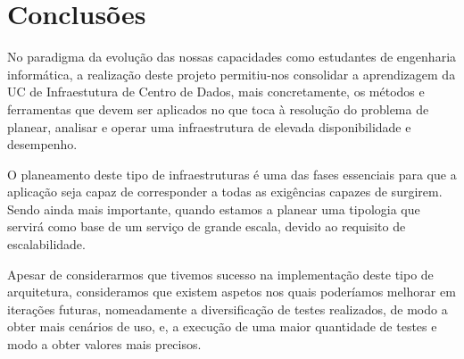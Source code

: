 \section{Conclusões}

No paradigma da evolução das nossas capacidades como estudantes de engenharia informática, a realização deste projeto permitiu-nos consolidar a aprendizagem da UC de Infraestutura de Centro de Dados, mais concretamente, os métodos e ferramentas que devem ser aplicados no que toca à resolução do problema de planear, analisar e operar uma infraestrutura de elevada disponibilidade e desempenho.

O planeamento deste tipo de infraestruturas é uma das fases essenciais para que a aplicação seja capaz de corresponder a todas as exigências capazes de surgirem. Sendo ainda mais importante, quando estamos a planear uma tipologia que servirá como base de um serviço de grande escala, devido ao requisito de escalabilidade.

Apesar de considerarmos que tivemos sucesso na implementação deste tipo de arquitetura, consideramos que existem aspetos nos quais poderíamos melhorar em iterações futuras, nomeadamente a diversificação de testes realizados, de modo a obter mais cenários de uso, e, a execução de uma maior quantidade de testes e modo a obter valores mais precisos.

\iffalse
Começámos o projeto com a criação de uma arquitetura básica, constituída por apenas duas máquinas conectadas entre si. Numa das máquinas instalamos a aplicação \textbf{wiki.js} e na outra uma base de dados \textbf{postgreSQL}. Esta implementação, evidentemente, não foi capaz de corresponder aos requisitos exigidos. A posterior realização e análise de testes de carga, a esta tipologia, veio provar isso mesmo.

Depois, utilizando as tecnologias lecionadas, idealizámos e instalámos uma tipologia que teoricamente seria capaz de corresponder aos nossos objetivos. De todos os métodos que acabámos por utilizar, achamos importante salientar os \textbf{load balancers} e os \textbf{clusters} que nos permitiram eliminar por completo os \textit{bottlenecks} existentes na versão anterior.

Os testes de carga que realizámos sobre a segunda versão, vieram demonstrar que houve uma tremenda evolução na capacidade de resposta e permitiram-nos concluir que esta implementação garante elevada disponibilidade. Porém, achamos que a nossa base de dados, apesar de todas as melhorias de performance, continua a ser um \textit{bottleneck} e que a sua implementação podia ser melhorada. 

Por fim, a nossa arquitetura satisfaz os requisitos no contexto do trabalho, pelo que, não consideramos necessário alterar a implementação da base de dados.
\fi 


\pagebreak